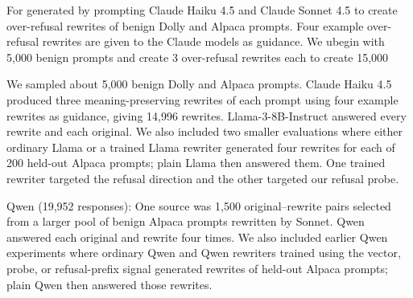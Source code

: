 \documentclass{article}
\begin{document}
For  generated by prompting Claude Haiku 4.5 and Claude Sonnet 4.5 to create over-refusal rewrites of benign Dolly and Alpaca prompts. Four example over-refusal rewrites are given to the Claude models as guidance. We ubegin with 5,000 benign prompts and create 3 over-refusal rewrites each to create 15,000


We sampled about 5,000 benign Dolly and Alpaca prompts. Claude Haiku 4.5 produced three meaning-preserving rewrites of each prompt using four example rewrites as guidance, giving 14,996 rewrites. Llama-3-8B-Instruct answered every rewrite and each original. We also included two smaller evaluations where either ordinary Llama or a trained Llama rewriter generated four rewrites for each of 200 held-out Alpaca prompts; plain Llama then answered them. One trained rewriter targeted the refusal direction and the other targeted our refusal probe.

Qwen (19,952 responses): One source was 1,500 original–rewrite pairs selected from a larger pool of benign Alpaca prompts rewritten by Sonnet. Qwen answered each original and rewrite four times. We also included earlier Qwen experiments where ordinary Qwen and Qwen rewriters trained using the vector, probe, or refusal-prefix signal generated rewrites of held-out Alpaca prompts; plain Qwen then answered those rewrites.



\end{document}
